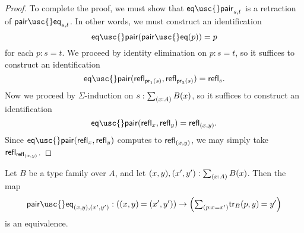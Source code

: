 \begin{proof}
To complete the proof, we must show that $\mathsf{eq\usc{}pair}_{s,t}$ is a retraction of $\mathsf{pair\usc{}eq}_{s,t}$. In other words, we must construct an identification
\begin{equation*}
\mathsf{eq\usc{}pair}(\mathsf{pair\usc{}eq}(p))=p
\end{equation*}
for each $p:s=t$. We proceed by identity elimination on $p:s=t$, so it suffices to construct an identification 
\begin{equation*}
\mathsf{eq\usc{}pair}\pairr{\refl{\proj 1(s)},\refl{\proj 2(s)}}=\refl{s}.
\end{equation*}
Now we proceed by $\Sigma$-induction on $s:\sm{x:A}B(x)$, so it suffices to construct an identification
\begin{equation*}
\mathsf{eq\usc{}pair}\pairr{\refl{x},\refl{y}}=\refl{(x,y)}.
\end{equation*}
Since $\mathsf{eq\usc{}pair}\pairr{\refl{x},\refl{y}}$ computes to $\mathsf{refl}_{(x,y)}$, we may simply take $\mathsf{refl}_{\mathsf{refl}_{(x,y)}}$.
\end{proof}

\begin{cor}
Let $B$ be a type family over $A$, and let $\pairr{x,y},\pairr{x',y'}:\sm{x:A}B(x)$. Then the map
\begin{equation*}
\mathsf{pair\usc{}eq}_{(x,y),(x',y')} : (\id{\pairr{x,y}}{\pairr{x',y'}})\to \Big(\sm{p:x=x'}\id{\mathsf{tr}_B(p,y)}{y'}\Big)
\end{equation*}
is an equivalence.
\end{cor}

